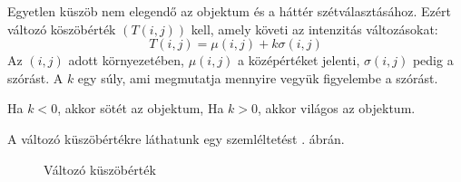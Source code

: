 

Egyetlen küszöb nem elegendő az objektum és a háttér szétválasztásához. Ezért változó köszöbérték $(T(i,j))$ kell, amely követi az intenzitás változásokat:
$$
T(i,j)=\mu(i, j) + k \sigma(i, j)
$$
Az $(i,j)$ adott környezetében, $\mu(i,j)$ a középértéket jelenti, $\sigma(i, j)$ pedig a szórást. A $k$ egy súly, ami megmutatja mennyire vegyük figyelembe a szórást.

Ha $k < 0$, akkor sötét az objektum,
Ha $k > 0$, akkor világos az objektum.

A változó küszöbértékre láthatunk egy szemléltetést . ábrán.

\begin{figure}[ht]
\centering
{}
\caption{Változó küszöbérték} 
\label{fig:niblack}
\end{figure}


